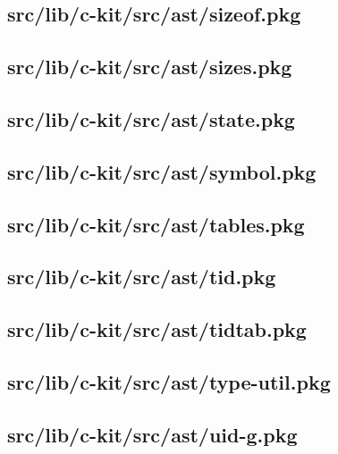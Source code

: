 \subsection{src/lib/c-kit/src/ast/sizeof.pkg}


\subsection{src/lib/c-kit/src/ast/sizes.pkg}


\subsection{src/lib/c-kit/src/ast/state.pkg}


\subsection{src/lib/c-kit/src/ast/symbol.pkg}


\subsection{src/lib/c-kit/src/ast/tables.pkg}


\subsection{src/lib/c-kit/src/ast/tid.pkg}


\subsection{src/lib/c-kit/src/ast/tidtab.pkg}


\subsection{src/lib/c-kit/src/ast/type-util.pkg}


\subsection{src/lib/c-kit/src/ast/uid-g.pkg}


